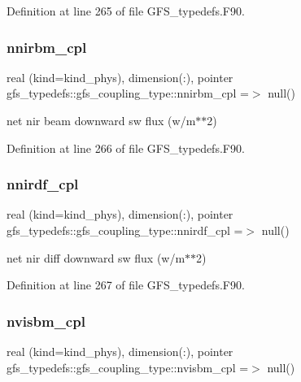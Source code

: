 Definition at line 265 of file G\+F\+S\+\_\+typedefs.\+F90.

\mbox{\label{structgfs__typedefs_1_1gfs__coupling__type_a43928daa4845549edf874acc64e74612}} 
\subsubsection{nnirbm\+\_\+cpl}
{\footnotesize\ttfamily real (kind=kind\+\_\+phys), dimension(\+:), pointer gfs\+\_\+typedefs\+::gfs\+\_\+coupling\+\_\+type\+::nnirbm\+\_\+cpl =$>$ null()}



net nir beam downward sw flux (w/m$\ast$$\ast$2) 



Definition at line 266 of file G\+F\+S\+\_\+typedefs.\+F90.

\mbox{\label{structgfs__typedefs_1_1gfs__coupling__type_a4981941e6fc109f6d586df4fb18d7c00}} 
\subsubsection{nnirdf\+\_\+cpl}
{\footnotesize\ttfamily real (kind=kind\+\_\+phys), dimension(\+:), pointer gfs\+\_\+typedefs\+::gfs\+\_\+coupling\+\_\+type\+::nnirdf\+\_\+cpl =$>$ null()}



net nir diff downward sw flux (w/m$\ast$$\ast$2) 



Definition at line 267 of file G\+F\+S\+\_\+typedefs.\+F90.

\mbox{\label{structgfs__typedefs_1_1gfs__coupling__type_aec62091a06542f3cda5cb31bbab05254}} 
\subsubsection{nvisbm\+\_\+cpl}
{\footnotesize\ttfamily real (kind=kind\+\_\+phys), dimension(\+:), pointer gfs\+\_\+typedefs\+::gfs\+\_\+coupling\+\_\+type\+::nvisbm\+\_\+cpl =$>$ null()}



